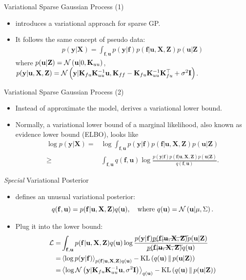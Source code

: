 \documentclass[14pt,aspectratio=1610]{beamer}
\newcommand{\yV}{\mathbf{y}}
\newcommand{\fV}{\mathbf{f}}
\newcommand{\xM}{\mathbf{X}}
\newcommand{\K}{\mathbf{K}}
\newcommand{\uV}{\mathbf{u}}
\newcommand{\zM}{\mathbf{Z}}
\newcommand{\bound}{\mathcal{L}}
\newcommand{\I}{\mathbf{I}}
\begin{document}
\begin{frame}{Variational Sparse Gaussian Process (1)}

\begin{itemize}
\item \cite{Titsias2009} introduces a variational approach for sparse GP.
\item It follows the same concept of pseudo data:
\begin{align*}
p(\yV| \xM) = \int_{\fV, \uV} p(\yV| \fV) p(\fV| \uV, \xM, \zM) p(\uV| \zM)
\end{align*}
where $p(\uV| \zM) = \gaussianDist{\uV}{0}{\K_{uu}}$, 
$p(\yV| \uV, \xM, \zM)=\gaussianDist{\yV}{\K_{fu} \K_{uu}^{-1} \uV}{\K_{ff} - \K_{fu} \K_{uu}^{-1} \K_{fu}^\top+\sigma^2\I}$.

\end{itemize}
\end{frame}

\begin{frame}{Variational Sparse Gaussian Process (2)}
\begin{itemize}
\item Instead of approximate the model, \cite{Titsias2009} derives a variational lower bound.

\item Normally, a variational lower bound of a marginal likelihood, also known as evidence lower bound (ELBO), looks like
\begin{align*}
\log p(\yV | \xM) =& \log \int_{\fV, \uV} p(\yV | \fV) p(\fV| \uV, \xM, \zM) p(\uV | \zM) \\
\geq& \int_{\fV, \uV} q(\fV, \uV) \log \frac{p(\yV | \fV) p(\fV| \uV, \xM, \zM) p(\uV | \zM)}{q(\fV, \uV)}.
\end{align*}
\end{itemize}

\end{frame}

\begin{frame}{\textit{Special} Variational Posterior}
\begin{itemize}
\item \cite{Titsias2009} defines an unusual variational posterior:
\[
q(\fV, \uV) = p(\fV| \uV, \xM, \zM) q(\uV), \quad \text{where } q(\uV) = \gaussianDist{\uV}{\mu}{\Sigma}.
\]
\item Plug it into the lower bound:
\begin{align*}
\bound =& \int_{\fV, \uV} p(\fV| \uV, \xM, \zM) q(\uV) \log \frac{p(\yV | \fV) \cancel{p(\fV| \uV, \xM, \zM)} p(\uV | \zM)}{\cancel{p(\fV| \uV, \xM, \zM)} q(\uV)} \\
=& \expectation{\log p(\yV | \fV)}_{p(\fV| \uV, \xM, \zM) q(\uV)} - \KL{q(\uV)}{p(\uV|\zM)}\\
=& \expectation{\log \gaussianDist{\yV}{\K_{fu}\K_{uu}^{-1}\uV}{\sigma^2\I}}_{q(\uV)} - \KL{q(\uV)}{p(\uV|\zM)}
\end{align*}

\end{itemize}
\end{frame}
\end{document}
